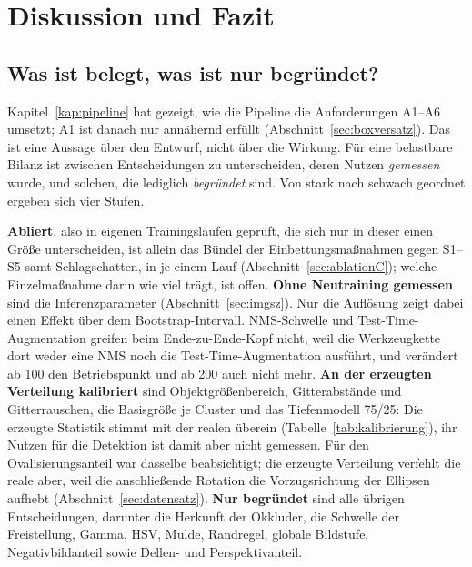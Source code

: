\chapter{Diskussion und Fazit}
\label{kap:diskussion}

\section{Was ist belegt, was ist nur begründet?}
\label{sec:tragend}

Kapitel~\ref{kap:pipeline} hat gezeigt, wie die Pipeline die Anforderungen
A1--A6 umsetzt; A1 ist danach nur annähernd erfüllt
(Abschnitt~\ref{sec:boxversatz}). Das ist eine Aussage über den Entwurf, nicht
über die Wirkung.
Für eine belastbare Bilanz ist zwischen Entscheidungen zu unterscheiden, deren
Nutzen \emph{gemessen} wurde, und solchen, die lediglich \emph{begründet} sind.
Von stark nach schwach geordnet ergeben sich vier Stufen.

\textbf{Abliert}, also in eigenen Trainingsläufen geprüft, die sich nur in
dieser einen Größe unterscheiden, ist allein das Bündel der
Einbettungsmaßnahmen gegen S1--S5 samt Schlagschatten, in je einem Lauf
(Abschnitt~\ref{sec:ablationC}); welche Einzelmaßnahme darin wie viel trägt,
ist offen. \textbf{Ohne Neutraining gemessen} sind die Inferenzparameter
(Abschnitt~\ref{sec:imgsz}). Nur die Auflösung zeigt dabei einen Effekt über
dem Bootstrap-Intervall. NMS-Schwelle und Test-Time-Augmentation greifen beim
Ende-zu-Ende-Kopf nicht, weil die Werkzeugkette dort weder eine NMS noch die
Test-Time-Augmentation ausführt, und  verändert ab 100 den
Betriebspunkt und ab 200 auch \mAPfifty{} nicht mehr.
\textbf{An der erzeugten Verteilung kalibriert} sind Objektgrößenbereich,
Gitterabstände und Gitterrauschen, die Basisgröße je Cluster und das
Tiefenmodell 75/25: Die erzeugte Statistik stimmt mit der realen überein
(Tabelle~\ref{tab:kalibrierung}), ihr Nutzen für die Detektion ist damit aber
nicht gemessen. Für den Ovalisierungsanteil war dasselbe beabsichtigt; die
erzeugte Verteilung verfehlt die reale aber, weil die anschließende Rotation
die Vorzugsrichtung der Ellipsen aufhebt (Abschnitt~\ref{sec:datensatz}).
\textbf{Nur begründet} sind alle übrigen Entscheidungen, darunter die Herkunft
der Okkluder, die Schwelle der Freistellung, Gamma, HSV, Mulde, Randregel, globale
Bildstufe, Negativbildanteil sowie Dellen- und Perspektivanteil.

